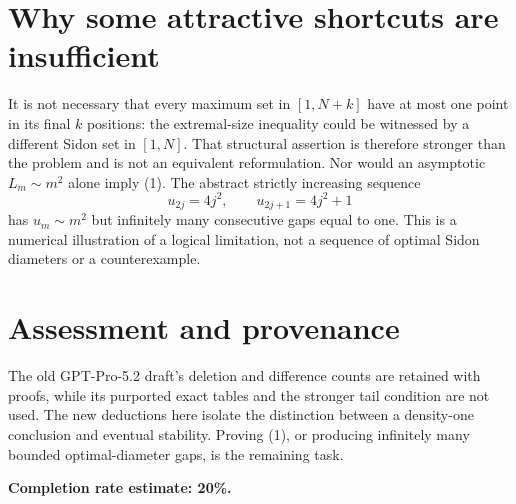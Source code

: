 \documentclass[11pt]{article}
\begin{document}
\section*{Why some attractive shortcuts are insufficient}
It is not necessary that every maximum set in $[1,N+k]$ have at most one point in its final $k$ positions: the extremal-size inequality could be witnessed by a different Sidon set in $[1,N]$. That structural assertion is therefore stronger than the problem and is not an equivalent reformulation.
Nor would an asymptotic $L_m\sim m^2$ alone imply (1). The abstract strictly increasing sequence
\[
 u_{2j}=4j^2,\qquad u_{2j+1}=4j^2+1
\]
has $u_m\sim m^2$ but infinitely many consecutive gaps equal to one. This is a numerical illustration of a logical limitation, not a sequence of optimal Sidon diameters or a counterexample.

\section*{Assessment and provenance}
The old GPT-Pro-5.2 draft's deletion and difference counts are retained with proofs, while its purported exact tables and the stronger tail condition are not used. The new deductions here isolate the distinction between a density-one conclusion and eventual stability. Proving (1), or producing infinitely many bounded optimal-diameter gaps, is the remaining task.

\textbf{Completion rate estimate: 20\%.}
\end{document}
